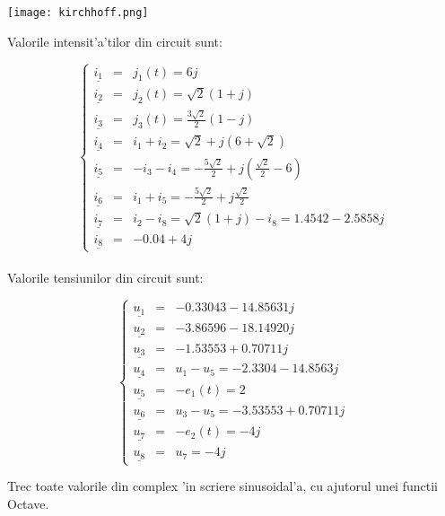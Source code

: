 \documentclass[titlepage, a4paper,12pt]{article}
\begin{document}
\begin{center}
\texttt{[image: kirchhoff.png]}
\end{center}

Valorile intensit'a'tilor din circuit sunt:

\begin{equation}
\left\{
\begin{array}{ccl}
\underline{i_1} & = & j_1(t) = 6j \\
\underline{i_2} & = & j_2(t) = \sqrt{2}(1+j) \\
\underline{i_3} & = & j_3(t) = \frac{3\sqrt{2}}{2}(1-j)\\
\underline{i_4} & = & i_1 + i_2 = \sqrt{2} + j(6+\sqrt{2}) \\
\underline{i_5} & = & -i_3 - i_4 = -\frac{5\sqrt{2}}{2} + j(\frac{\sqrt{2}}{2}-6) \\
\underline{i_6} & = & i_1 + i_5 = -\frac{5\sqrt{2}}{2} + j\frac{\sqrt{2}}{2} \\
\underline{i_7} & = & i_2-i_8 = \sqrt{2}(1+j) - i_8 = 1.4542 - 2.5858j\\
\underline{i_8} & = & -0.04 +  4j
\end{array}  
\right. \nonumber %
\end{equation} \\

Valorile tensiunilor din circuit sunt:

\begin{equation}
\left\{
\begin{array}{ccl}
\underline{u_1} & = & -0.33043 - 14.85631j \\
\underline{u_2} & = & -3.86596 - 18.14920j \\
\underline{u_3} & = & -1.53553 +  0.70711j \\
\underline{u_4} & = & u_1 - u_5 = -2.3304 - 14.8563j \\
\underline{u_5} & = & -e_1(t) = 2 \\
\underline{u_6} & = & u_3 - u_5 = -3.53553 + 0.70711j \\
\underline{u_7} & = & -e_2(t) = -4j \\
\underline{u_8} & = & u_7 = -4j
\end{array}  
\right. \nonumber %
\end{equation} 

Trec toate valorile din complex 'in scriere sinusoidal'a, cu ajutorul unei functii Octave.
\end{document}
